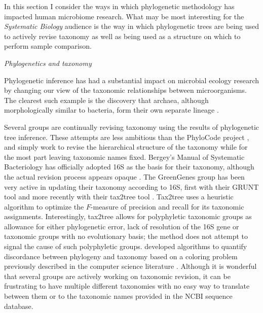 \documentclass{amsart}
\renewcommand{\subsection}[1]{%
\bigskip
\begin{center}
\begin{large}
\normalfont\itshape #1
\end{large}
\end{center}}
\begin{document}
In this section I consider the ways in which phylogenetic methodology has impacted human microbiome research.
What may be most interesting for the \textit{Systematic Biology} audience is the way in which phylogenetic trees are being used to actively revise taxonomy as well as being used as a structure on which to perform sample comparison.

\subsection{Phylogenetics and taxonomy}

Phylogenetic inference has had a substantial impact on microbial ecology research by changing our view of the taxonomic relationships between microorganisms.
The clearest such example is the discovery that archaea, although morphologically similar to bacteria, form their own separate lineage \citep{woese1977phylogenetic}.

Several groups are continually revising taxonomy using the results of phylogenetic tree inference.
These attempts are less ambitious than the PhyloCode project \citep[to develop a taxonomic scheme expressed directly in terms of a phylogeny; see][]{forey2001phylocode}, and simply work to revise the hierarchical structure of the taxonomy while for the most part leaving taxonomic names fixed.
Bergey's Manual of Systematic Bacteriology has officially adopted 16S as the basis for their taxonomy, although the actual revision process appears opaque \citep{kreig1984bergey}.
The GreenGenes group \citep{desantis2006greengenes} has been very active in updating their taxonomy according to 16S, first with their GRUNT tool \citep{dalevi2007automated} and more recently with their tax2tree tool \citep{mcdonald2011improved}.
Tax2tree uses a heuristic algorithm to optimize the $F$-measure of precision and recall for its taxonomic assignments.
Interestingly, tax2tree allows for polyphyletic taxonomic groups as allowance for either phylogenetic error, lack of resolution of the 16S gene or taxonomic groups with no evolutionary basis; the method does not attempt to signal the cause of such polyphyletic groups.
\citet{matsen2012reconciling} developed algorithms to quantify discordance between phylogeny and taxonomy based on a coloring problem previously described in the computer science literature \citep{moran2008convex}.
Although it is wonderful that several groups are actively working on taxonomic revision, it can be frustrating to have multiple different taxonomies with no easy way to translate between them or to the taxonomic names provided in the NCBI sequence database.
\end{document}
